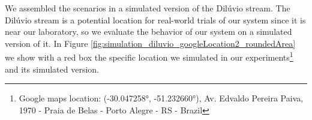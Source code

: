     We assembled the scenarios in a simulated version of the Dilúvio stream. The Dilúvio stream is a potential location for real-world trials of our system since it is near our laboratory, so we evaluate the behavior of our system on a simulated version of it. In Figure \ref{fig:simulation_diluvio_googleLocation2_roundedArea} we show with a red box the specific location we simulated in our experiments\footnote{Google maps location: (-30.047258°, -51.232660°), Av. Edvaldo Pereira Paiva, 1970 - Praia de Belas - Porto Alegre - RS - Brazil} and its simulated version.
     
